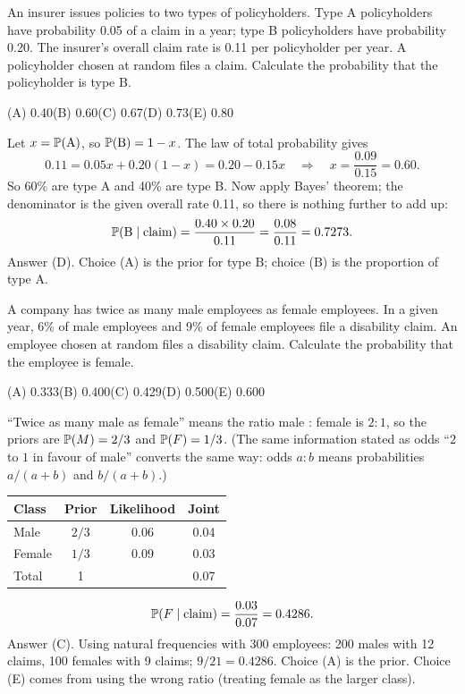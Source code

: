 \begin{example}
An insurer issues policies to two types of policyholders. Type A policyholders have
probability 0.05 of a claim in a year; type B policyholders have probability 0.20. The
insurer's overall claim rate is 0.11 per policyholder per year. A policyholder chosen at
random files a claim. Calculate the probability that the policyholder is type B.
\par\smallskip\noindent (A) 0.40\qquad (B) 0.60\qquad (C) 0.67\qquad (D) 0.73\qquad (E) 0.80
\end{example}
\begin{solution}
Let $x = \mathbb{P}(\text{A})$, so $\mathbb{P}(\text{B}) = 1 - x$. The law of total probability gives
\[
0.11 = 0.05x + 0.20(1 - x) = 0.20 - 0.15x
\quad\Longrightarrow\quad
x = \frac{0.09}{0.15} = 0.60.
\]
So 60\% are type A and 40\% are type B. Now apply Bayes' theorem; the denominator is the
given overall rate 0.11, so there is nothing further to add up:
\[
\mathbb{P}(\text{B} \mid \text{claim}) = \frac{0.40 \times 0.20}{0.11} = \frac{0.08}{0.11} = 0.7273.
\]
Answer (D). Choice (A) is the prior for type B; choice (B) is the proportion of type A.
\end{solution}

\begin{example}
A company has twice as many male employees as female employees. In a given year, 6\% of male
employees and 9\% of female employees file a disability claim. An employee chosen at random
files a disability claim. Calculate the probability that the employee is female.
\par\smallskip\noindent (A) 0.333\qquad (B) 0.400\qquad (C) 0.429\qquad (D) 0.500\qquad (E) 0.600
\end{example}
\begin{solution}
``Twice as many male as female'' means the ratio male : female is $2 : 1$, so the priors are
$\mathbb{P}(M) = 2/3$ and $\mathbb{P}(F) = 1/3$. (The same information stated as odds ``$2$ to $1$
in favour of male'' converts the same way: odds $a : b$ means probabilities $a/(a+b)$ and
$b/(a+b)$.)
\begin{center}
\begin{tabular}{@{}lccc@{}}
\toprule
Class & Prior & Likelihood & Joint \\
\midrule
Male   & $2/3$ & 0.06 & 0.04 \\
Female & $1/3$ & 0.09 & 0.03 \\
\midrule
Total  & 1 & & 0.07 \\
\bottomrule
\end{tabular}
\end{center}
\[
\mathbb{P}(F \mid \text{claim}) = \frac{0.03}{0.07} = 0.4286.
\]
Answer (C). Using natural frequencies with 300 employees: 200 males with 12 claims, 100
females with 9 claims; $9/21 = 0.4286$. Choice (A) is the prior. Choice (E) comes from
using the wrong ratio (treating female as the larger class).
\end{solution}

